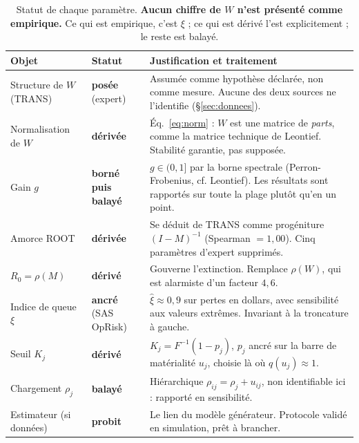 \documentclass[11pt,a4paper]{article}
\begin{document}
\begin{table}[htbp]\centering\small
\renewcommand{\arraystretch}{1.35}
\begin{tabular}{@{}>{\raggedright\arraybackslash}p{2.6cm} >{\raggedright\arraybackslash}p{2.9cm} >{\raggedright\arraybackslash}p{8.4cm}@{}}
\toprule
\textbf{Objet} & \textbf{Statut} & \textbf{Justification et traitement} \\
\midrule
Structure de $W$ (TRANS) & \textbf{posée} (expert) & Assumée comme hypothèse déclarée, non comme mesure. Aucune des deux sources ne l'identifie (\S\ref{sec:donnees}). \\
\addlinespace[2pt]
Normalisation de $W$ & \textbf{dérivée} & Éq.~\eqref{eq:norm} : $W$ est une matrice de \emph{parts}, comme la matrice technique de Leontief. Stabilité garantie, pas supposée. \\
\addlinespace[2pt]
Gain $g$ & \textbf{borné puis balayé} & $g\in(0,1]$ par la borne spectrale (Perron-Frobenius, cf. Leontief). Les résultats sont rapportés sur toute la plage plutôt qu'en un point. \\
\addlinespace[2pt]
Amorce ROOT & \textbf{dérivée} & Se déduit de TRANS comme progéniture $(I-M)^{-1}$ (Spearman $=1{,}00$). Cinq paramètres d'expert supprimés. \\
\addlinespace[2pt]
$R_0 = \rho(M)$ & \textbf{dérivé} & Gouverne l'extinction. Remplace $\rho(W)$, qui est alarmiste d'un facteur $4{,}6$. \\
\addlinespace[2pt]
Indice de queue $\xi$ & \textbf{ancré} (SAS OpRisk) & $\hat\xi \approx 0{,}9$ sur pertes en dollars, avec sensibilité aux valeurs extrêmes. Invariant à la troncature à gauche. \\
\addlinespace[2pt]
Seuil $K_j$ & \textbf{dérivé} & $K_j = F^{-1}(1-p_j)$, $p_j$ ancré sur la barre de matérialité $u_j$, choisie là où $q(u_j)\approx 1$. \\
\addlinespace[2pt]
Chargement $\rho_j$ & \textbf{balayé} & Hiérarchique $\rho_{ij}=\rho_j+u_{ij}$, non identifiable ici : rapporté en sensibilité. \\
\addlinespace[2pt]
Estimateur (si données) & \textbf{probit} & Le lien du modèle générateur. Protocole validé en simulation, prêt à brancher. \\
\bottomrule
\end{tabular}
\caption{Statut de chaque paramètre. \textbf{Aucun chiffre de $W$ n'est présenté comme
empirique.} Ce qui est empirique, c'est $\xi$ ; ce qui est dérivé l'est explicitement ; le
reste est balayé.}
\end{table}
\end{document}
